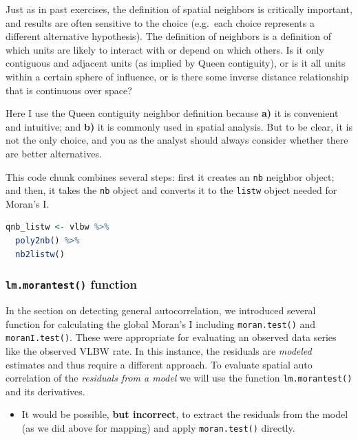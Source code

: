 \documentclass[
]{book}
\newcommand{\passthrough}[1]{#1}
\newenvironment{rmdblock}[1]
  {%
  \begin{itemize}
  \renewcommand{\labelitemi}{
    \raisebox{-.7\height}[0pt][0pt]{
      {\setkeys{Gin}{width=3em,keepaspectratio}\texttt{[image: images/\#1]}}
    }
  }
  \item
  }
  {
  \end{itemize}
  }
\newenvironment{rmdcaution}
  {\begin{rmdblock}{caution}}
  {\end{rmdblock}}
\begin{document}
Just as in past exercises, the definition of spatial neighbors is critically important, and results are often sensitive to the choice (e.g.~each choice represents a different alternative hypothesis). The definition of neighbors is a definition of which units are likely to interact with or depend on which others. Is it only contiguous and adjacent units (as implied by Queen contiguity), or is it all units within a certain sphere of influence, or is there some inverse distance relationship that is continuous over space?

Here I use the Queen contiguity neighbor definition because \textbf{a)} it is convenient and intuitive; and \textbf{b)} it is commonly used in spatial analysis. But to be clear, it is not the only choice, and you as the analyst should always consider whether there are better alternatives.

This code chunk combines several steps: first it creates an \passthrough{\lstinline!nb!} neighbor object; and then, it takes the \passthrough{\lstinline!nb!} object and converts it to the \passthrough{\lstinline!listw!} object needed for Moran's I.

\begin{lstlisting}[language=R]
qnb_listw <- vlbw %>%
  poly2nb() %>%
  nb2listw()
\end{lstlisting}

\hypertarget{lm.morantest-function}{%
\subsubsection{\texorpdfstring{\texttt{lm.morantest()} function}{lm.morantest() function}}\label{lm.morantest-function}}

In the section on detecting general autocorrelation, we introduced several function for calculating the global Moran's I including \passthrough{\lstinline!moran.test()!} and \passthrough{\lstinline!moranI.test()!}. These were appropriate for evaluating an observed data series like the observed VLBW rate. In this instance, the residuals are \emph{modeled} estimates and thus require a different approach. To evaluate spatial auto correlation of the \emph{residuals from a model} we will use the function \passthrough{\lstinline!lm.morantest()!} and its derivatives.

\begin{rmdcaution}
It would be possible, \textbf{but incorrect}, to extract the residuals from the model (as we did above for mapping) and apply \passthrough{\lstinline!moran.test()!} directly.
\end{rmdcaution}
\end{document}
